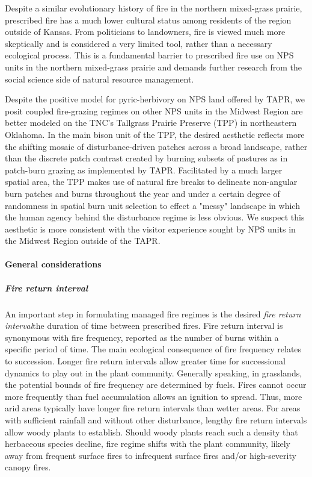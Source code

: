Despite a similar evolutionary history of fire in the northern mixed-grass prairie, prescribed fire has a much lower cultural status among residents of the region outside of Kansas. 
From politicians to landowners, fire is viewed much more skeptically and is considered a very limited tool, rather than a necessary ecological process. 
This is a fundamental barrier to prescribed fire use on NPS units in the northern mixed-grass prairie and demands further research from the social science side of natural resource management. 

Despite the positive model for pyric-herbivory on NPS land offered by TAPR, we posit coupled fire-grazing regimes on other NPS units in the Midwest Region are better modeled on the TNC's Tallgrass Prairie Preserve (TPP) in northeastern Oklahoma.
In the main bison unit of the TPP, the desired aesthetic reflects more the shifting mosaic of disturbance-driven patches across a broad landscape, rather than the discrete patch contrast created by burning subsets of pastures as in patch-burn grazing as implemented by TAPR. 
Facilitated by a much larger spatial area, the TPP makes use of natural fire breaks to delineate non-angular burn patches and burns throughout the year and under a certain degree of randomness in spatial burn unit selection to effect a "messy" landscape in which the human agency behind the disturbance regime is less obvious.
We suspect this aesthetic is more consistent with the visitor experience sought by NPS units in the Midwest Region outside of the TAPR.

\paragraph{General considerations}

\subparagraph{Fire return interval}

An important step in formulating managed fire regimes is the desired \emph{fire return interval}\textemdash the duration of time between prescribed fires. 
Fire return interval is synonymous with fire frequency, reported as the number of burns within a specific period of time. 
The main ecological consequence of fire frequency relates to succession. 
Longer fire return intervals allow greater time for successional dynamics to play out in the plant community. 
Generally speaking, in grasslands, the potential bounds of fire frequency are determined by fuels.
Fires cannot occur more frequently than fuel accumulation allows an ignition to spread. 
Thus, more arid areas typically have longer fire return intervals than wetter areas. 
For areas with sufficient rainfall and without other disturbance, lengthy fire return intervals allow woody plants to establish.
Should woody plants reach such a density that herbaceous species decline, fire regime shifts with the plant community, likely away from frequent surface fires to infrequent surface fires and/or high-severity canopy fires. 

